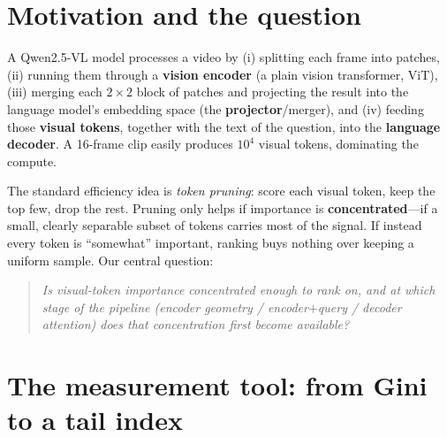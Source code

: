 \documentclass[11pt]{article}
\begin{document}
\begin{abstract}
The deployable direction that survives is uniform / recoverable compression, not
importance-ranked selection at the token or the frame level. \emph{All seven findings
replicate on long-form EgoSchema} (500-question Subset, $\sim$3-minute egocentric clips):
the encoder stays uniform, and the decoder stays concentrated but not causally
exploitable. Two effects are if anything \emph{stronger} at long context---the
frame-selection lever (a chosen frame beats all frames by even more, at matched frame
count) and answer-confidence as the sole marker of the answer frame---so none of the
negatives are a short-clip artifact.
\end{abstract}

\tableofcontents

\section{Motivation and the question}

A Qwen2.5-VL model processes a video by (i) splitting each frame into patches,
(ii) running them through a \textbf{vision encoder} (a plain vision transformer,
ViT), (iii) merging each $2\times2$ block of patches and projecting the result
into the language model's embedding space (the \textbf{projector}/merger), and
(iv) feeding those \textbf{visual tokens}, together with the text of the question,
into the \textbf{language decoder}. A 16-frame clip easily produces $10^4$ visual
tokens, dominating the compute.

The standard efficiency idea is \emph{token pruning}: score each visual token,
keep the top few, drop the rest. Pruning only helps if importance is
\textbf{concentrated}---if a small, clearly separable subset of tokens carries most
of the signal. If instead every token is ``somewhat'' important, ranking buys
nothing over keeping a uniform sample. Our central question:
\begin{quote}
\emph{Is visual-token importance concentrated enough to rank on, and at which
stage of the pipeline (encoder geometry / encoder$+$query / decoder attention)
does that concentration first become available?}
\end{quote}

\section{The measurement tool: from Gini to a tail index}
\end{document}
